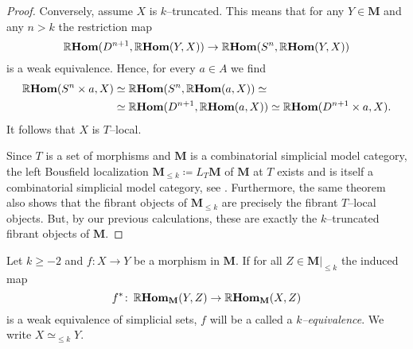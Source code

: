 \begin{proof}
  Conversely, assume \(X\) is \(k\)--truncated. This means that for any \(Y\in\mathbf{M}\) and any \(n>k\) the restriction map
  \[\operatorname{\mathbb{R}\textnormal{\bfseries Hom}}(D^{n+1}, \operatorname{\mathbb{R}\textnormal{\bfseries Hom}}(Y,X)) \to \operatorname{\mathbb{R}\textnormal{\bfseries Hom}}(S^{n}, \operatorname{\mathbb{R}\textnormal{\bfseries Hom}}(Y,X))\]
  is a weak equivalence. Hence, for every \(a\in A\) we find
  \begin{align*}
    \operatorname{\mathbb{R}\textnormal{\bfseries Hom}}(S^{n}\times a, X) &\simeq \operatorname{\mathbb{R}\textnormal{\bfseries Hom}}(S^{n}, \operatorname{\mathbb{R}\textnormal{\bfseries Hom}}(a, X))\simeq \\
    &\simeq \operatorname{\mathbb{R}\textnormal{\bfseries Hom}}(D^{n+1}, \operatorname{\mathbb{R}\textnormal{\bfseries Hom}}(a, X))\simeq \operatorname{\mathbb{R}\textnormal{\bfseries Hom}}(D^{n+1}\times a, X).
  \end{align*}
  It follows that \(X\) is \(T\)--local.

  Since \(T\) is a set of morphisms and \(\mathbf{M}\) is a combinatorial simplicial model category, the left Bousfield localization \(\mathbf{M}_{\leq k} \coloneqq L_{T}\mathbf{M}\) of \(\mathbf{M}\) at \(T\) exists and is itself a combinatorial simplicial model category, see \cite[Prop.~A.3.7.3]{mr2522659}. Furthermore, the same theorem also shows that the fibrant objects of \(\mathbf{M}_{\leq k}\) are precisely the fibrant \(T\)--local objects. But, by our previous calculations, these are exactly the \(k\)--truncated fibrant objects of \(\mathbf{M}\).
\end{proof}

\begin{definition}
  Let \(k\geq -2\) and \(f\colon X\to Y\) be a morphism in \(\mathbf M\). If for all \(Z\in\mathbf M|_{\leq k}\) the induced map
  \[f^{*}\colon \operatorname{\mathbb{R}\textnormal{\bfseries Hom}}_{\mathbf M}(Y, Z) \to \operatorname{\mathbb{R}\textnormal{\bfseries Hom}}_{\mathbf M}(X, Z)\]
  is a weak equivalence of simplicial sets, \(f\) will be a called a \emph{\(k\)--equivalence}. We write \(X\simeq_{\leq k} Y\).
\end{definition}


